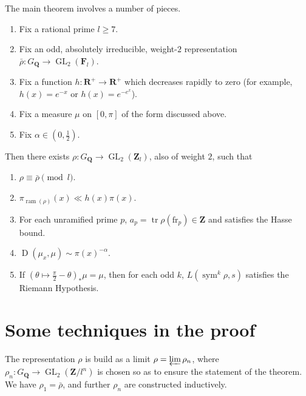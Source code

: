 \documentclass{article}
\DeclareMathOperator{\D}{D}
\DeclareMathOperator{\GL}{GL}
\DeclareMathOperator{\ram}{ram}
\DeclareMathOperator{\sym}{sym}
\DeclareMathOperator{\tr}{tr}
\newcommand{\bF}{\mathbf{F}}
\newcommand{\bQ}{\mathbf{Q}}
\newcommand{\bR}{\mathbf{R}}
\newcommand{\bZ}{\mathbf{Z}}
\newcommand{\frob}{\mathrm{fr}}
\begin{document}
The main theorem involves a number of pieces.
\begin{enumerate}
\item
Fix a rational prime $l\geqslant 7$. 

\item
Fix an odd, absolutely irreducible, weight-$2$ representation 
$\bar\rho\colon G_\bQ \to \GL_2(\bF_l)$. 

\item
Fix a function $h\colon \bR^+ \to \bR^+$ which decreases rapidly to zero (for 
example, $h(x) = e^{-x}$ or $h(x) = e^{-e^x}$). 

\item
Fix a measure $\mu$ on $[0,\pi]$ of the form discussed above. 

\item
Fix $\alpha\in \left(0,\frac 1 2\right)$. 
\end{enumerate}
Then there exists $\rho\colon G_\bQ \to \GL_2(\bZ_l)$, also of weight $2$, 
such that 
\begin{enumerate}
\item
$\rho\equiv \bar\rho\pmod l$. 

\item
$\pi_{\ram(\rho)}(x) \ll h(x) \pi(x)$. 

\item
For each unramified prime $p$, $a_p = \tr \rho(\frob_p)\in \bZ$ and satisfies 
the Hasse bound. 

\item
$\D(\mu_x,\mu) \sim \pi(x)^{-\alpha}$. 

\item
If $(\theta\mapsto \frac \pi 2 - \theta)_\ast \mu = \mu$, then for each odd 
$k$, $L(\sym^k \rho,s)$ satisfies the Riemann Hypothesis. 
\end{enumerate}





\section{Some techniques in the proof}

The representation $\rho$ is build as a limit $\rho = \varprojlim \rho_n$, 
where $\rho_n\colon G_\bQ \to \GL_2(\bZ/l^n)$ is chosen so as to ensure the 
statement of the theorem. We have $\rho_1 = \bar\rho$, and further $\rho_n$ 
are constructed inductively. 
\end{document}
